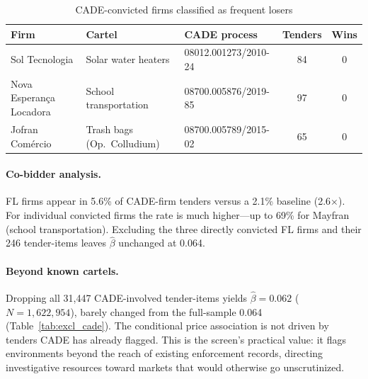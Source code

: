 \begin{table}[htbp]
\centering
\caption{CADE-convicted firms classified as frequent losers}
\label{tab:cade_fl_firms}
\small
\begin{tabular}{lllcc}
\toprule
Firm & Cartel & CADE process & Tenders & Wins \\
\midrule
Sol Tecnologia & Solar water heaters & 08012.001273/2010-24 & 84 & 0 \\
Nova Esperan\c{c}a Locadora & School transportation & 08700.005876/2019-85 & 97 & 0 \\
Jofran Com\'ercio & Trash bags (Op.\ Colludium) & 08700.005789/2015-02 & 65 & 0 \\
\bottomrule
\end{tabular}
\end{table}

\paragraph{Co-bidder analysis.}
FL firms appear in 5.6\% of CADE-firm tenders versus a 2.1\% baseline
(2.6$\times$). For individual convicted firms the rate is much
higher---up to 69\% for Mayfran (school transportation). Excluding
the three directly convicted FL firms and their 246 tender-items
leaves $\hat{\beta}$ unchanged at 0.064.

\paragraph{Beyond known cartels.}
Dropping all 31,447 CADE-involved tender-items yields
$\hat{\beta} = 0.062$ ($N = 1{,}622{,}954$), barely changed from the
full-sample 0.064 (Table~\ref{tab:excl_cade}). The conditional price
association is not driven by tenders CADE has already flagged. This is
the screen's practical value: it flags environments beyond the reach
of existing enforcement records, directing investigative resources
toward markets that would otherwise go unscrutinized.

